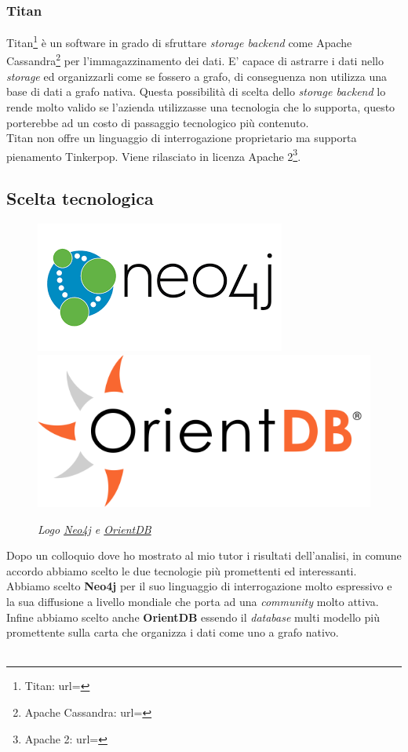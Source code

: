 \subsubsection{Titan}
Titan\footnote{Titan: url= } è un software in grado di sfruttare \textit{storage backend} come Apache Cassandra\footnote{Apache Cassandra: url= } per l'immagazzinamento dei dati. E' capace di astrarre i dati nello \textit{storage} ed organizzarli come se fossero a grafo, di conseguenza non utilizza una base di dati a grafo nativa.
Questa possibilità di scelta dello \textit{storage backend} lo rende molto valido se l'azienda utilizzasse una tecnologia che lo supporta, questo porterebbe ad un costo di passaggio tecnologico più contenuto.\\
Titan non offre un linguaggio di interrogazione proprietario ma supporta pienamento Tinkerpop.  Viene rilasciato in licenza Apache 2\footnote{Apache 2: url= }.
\subsection{Scelta tecnologica}
\begin{figure}[h!]
	\centering
	\includegraphics[scale=0.45]{immagini/neo4j.png}
	\includegraphics[scale=0.3]{immagini/orientdb.png}
	\caption{\textit{Logo \href{https://neo4j.com/}{Neo4j} e \href{http://orientdb.com/orientdb/}{OrientDB}}}
\end{figure}
Dopo un colloquio dove ho mostrato al mio tutor i risultati dell'analisi, in comune accordo abbiamo scelto le due tecnologie più promettenti ed interessanti.\\
Abbiamo scelto \textbf{Neo4j} per il suo linguaggio di interrogazione molto espressivo e la sua diffusione a livello mondiale che porta ad una \textit{community} molto attiva.\\
Infine abbiamo scelto anche \textbf{OrientDB} essendo il \textit{database} multi modello più promettente sulla carta che organizza i dati come uno a grafo nativo.
\\
\\

